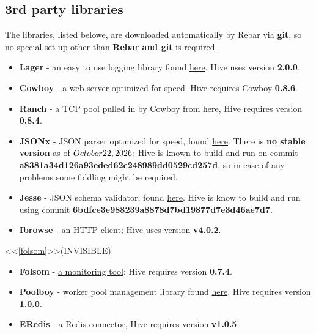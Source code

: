 \documentclass[a4paper]{article}
\begin{document}
\subsection{3rd party libraries}
\label{sec-1-3}

The libraries, listed belowe, are downloaded automatically by Rebar via \textbf{git}, so no special set-up other than \textbf{Rebar and git} is required.


\begin{itemize}
\item \textbf{Lager} - an easy to use logging library found \href{https://github.com/basho/lager}{here}. Hive uses version \textbf{2.0.0}.
\item \textbf{Cowboy} - \href{https://github.com/extend/cowboy}{a web server} optimized for speed. Hive requires Cowboy \textbf{0.8.6}.
\item \textbf{Ranch} - a TCP pool pulled in by Cowboy from \href{https://github.com/extend/ranch}{here}, Hive requires version \textbf{0.8.4}.
\item \textbf{JSONx} - JSON parser optimized for speed, found \href{https://github.com/iskra/jsonx}{here}. There is \textbf{no stable version} as of $\today$; Hive is known to build and run on commit \textbf{a8381a34d126a93eded62c248989dd0529cd257d}, so in case of any problems some fiddling might be required.
\item \textbf{Jesse} - JSON schema validator, found \href{https://github.com/alertlogic/jesse}{here}. Hive is know to build and run using commit \textbf{6bdfce3e988239a8878d7bd19877d7e3d46ae7d7}.
\item \textbf{Ibrowse} - \href{https://github.com/cmullaparthi/ibrowse}{an HTTP client}; Hive uses version \textbf{v4.0.2}.
\end{itemize}

<<\ref{folsom}>>(INVISIBLE)

\begin{itemize}
\item \textbf{Folsom} - \href{https://github.com/boundary/folsom}{a monitoring tool}; Hive requires version \textbf{0.7.4}.
\item \textbf{Poolboy} - worker pool management library found \href{https://github.com/devinus/poolboy}{here}. Hive requires version \textbf{1.0.0}.
\item \textbf{ERedis} - \href{https://github.com/wooga/eredis}{a Redis connector}, Hive requires version \textbf{v1.0.5}.
\end{itemize}
\end{document}
